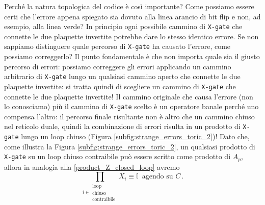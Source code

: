 \noindent Perché la natura topologica del codice è così importante? Come possiamo essere certi che l'errore appena spiegato sia dovuto alla linea arancio di bit flip e non, ad esempio, alla linea verde? In principio ogni possibile cammino di \texttt{X-gate} che connette le due plaquette invertite potrebbe dare lo stesso identico errore. Se non sappiamo distinguere quale percorso di \texttt{X-gate} ha causato l'errore, come possiamo correggerlo? Il punto fondamentale è che non importa quale sia il giusto percorso di errori: possiamo correggere gli errori applicando un cammino arbitrario di \texttt{X-gate} lungo un qualsiasi cammino aperto che connette le due plaquette invertite: si tratta quindi di scegliere un cammino di \texttt{X-gate} che connette le due plaquette invertite! Il cammino originale che causa l'errore (non lo conosciamo) più il cammino di \texttt{X-gate} scelto è un operatore banale perché uno compensa l'altro: il percorso finale risultante non è altro che un cammino chiuso nel reticolo duale, quindi la combinazione di errori risulta in un prodotto di \texttt{X-gate} lungo un loop chiuso (Figura \ref{subfig:strange_errors_toric_2})! Dato che, come illustra la Figura \ref{subfig:strange_errors_toric_2}, un qualsiasi prodotto di \texttt{X-gate} su un loop chiuso contraibile può essere scritto come prodotto di $A_p$, allora in analogia alla \eqref{product_Z_closed_loop} avremo
\begin{equation}\label{product_X_closed_loop}
    \prod_{i \in \substack{\text{loop} \\ \text{chiuso}\\ \text{contraibile}}} X_i \equiv \mathbb{I} \, \text{ agendo su } C \, .
\end{equation}

